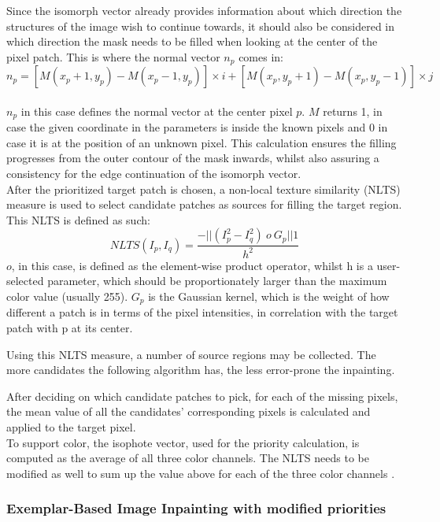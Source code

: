 Since the isomorph vector already provides information about which direction the structures of the image wish to continue towards, it should also be considered in which direction the mask needs to be filled when looking at the center of the pixel patch. This is where the normal vector $n_p$ comes in: 
\[n_p = [M(x_p + 1, y_p) - M(x_p - 1, y_p)] \times i + [M(x_p, y_p + 1) - M(x_p, y_p - 1)] \times j \]
\\
$n_p$ in this case defines the normal vector at the center pixel $p$. $M$ returns 1, in case the given coordinate in the parameters is inside the known pixels and 0 in case it is at the position of an unknown pixel.
This calculation ensures the filling progresses from the outer contour of the mask inwards, whilst also assuring a consistency for the edge continuation of the isomorph vector.\\

After the prioritized target patch is chosen, a non-local texture similarity (NLTS) measure is used to select candidate patches as sources for filling the target region.
This NLTS is defined as such:
\[NLTS(I_p, I_q) = \dfrac{-||(I_p^2-I_q^2)\ o\ G_p||1}{h^2}\]
$o$, in this case, is defined as the element-wise product operator, whilst h is a user-selected parameter, which should be proportionately larger than the maximum color value (usually 255).
$G_p$ is the Gaussian kernel, which is the weight of how different a patch is in terms of the pixel intensities, in correlation with the target patch with p at its center.

Using this NLTS measure, a number of source regions may be collected. The more candidates the following algorithm has, the less error-prone the inpainting.

After deciding on which candidate patches to pick, for each of the missing pixels, the mean value of all the candidates' corresponding pixels is calculated and applied to the target pixel.\\
To support color, the isophote vector, used for the priority calculation, is computed as the average of all three color channels. The NLTS needs to be modified as well to sum up the value above for each of the three color channels \cite{DingRam2019}.

\subsubsection{Exemplar-Based Image Inpainting with modified priorities}
\label{cha:ELTMTheory}

